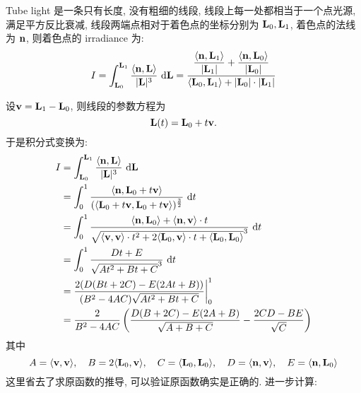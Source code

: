 Tube light 是一条只有长度, 没有粗细的线段, 线段上每一处都相当于一个点光源, 满足平方反比衰减, 线段两端点相对于着色点的坐标分别为 $\bold{L}_0, \bold{L}_1$, 着色点的法线为 $\bold{n}$, 则着色点的 irradiance 为:
\[I = \int_{\bold{L}_0}^{\bold{L}_1}\frac{\langle \bold{n},\bold{L} \rangle}{|\bold{L}|^3}\ \mathrm{d}\bold{L} = \frac{\dfrac{\langle\bold{n},\bold{L}_1\rangle}{|\bold{L}_1|}+\dfrac{\langle\bold{n},\bold{L}_0\rangle}{|\bold{L}_0|} }{\langle\bold{L}_0,\bold{L}_1\rangle + |\bold{L}_0|\cdot|\bold{L}_1|}\]

设$\bold{v} = \bold{L}_1 - \bold{L}_0$, 则线段的参数方程为 
\[
\bold{L}(t) = \bold{L}_0 + t\bold{v}.
\]
于是积分式变换为:
\begin{align*}
I &= \int_{\bold{L}_0}^{\bold{L}_1}\frac{\langle \bold{n},\bold{L} \rangle}{|\bold{L}|^3}\ \mathrm{d}\bold{L} \\
&= \int_0^1\frac{\langle \bold{n}, \bold{L}_0+t\bold{v} \rangle}{(\langle \bold{L}_0+t\bold{v},\bold{L}_0+t\bold{v}\rangle)^{\frac{3}{2}}}\ \mathrm{d}t \\
&= \int_0^1\frac{\langle\bold{n},\bold{L}_0\rangle + \langle\bold{n},\bold{v}\rangle\cdot t}{\sqrt{\langle\bold{v},\bold{v}\rangle\cdot t^2 + 2\langle\bold{L}_0,\bold{v}\rangle\cdot t + \langle\bold{L}_0,\bold{L}_0\rangle}^3}\ \mathrm{d}t \\
&= \int_0^1\frac{Dt+E}{\sqrt{At^2+Bt+C}^3}\ \mathrm{d}t \\
&= \frac{2(D(Bt+2C) - E(2At+B))}{(B^2-4AC)\sqrt{At^2+Bt+C}}\bigg|_0^1\\
&= \frac{2}{B^2-4AC}\left(\frac{D(B + 2C) - E(2A+B)}{\sqrt{A+B+C}} - \frac{2CD - BE}{\sqrt{C}}\right)
\end{align*}
其中
\[
A = \langle\bold{v},\bold{v}\rangle, \quad
B = 2\langle\bold{L}_0,\bold{v}\rangle, \quad
C = \langle\bold{L}_0,\bold{L}_0\rangle, \quad
D = \langle\bold{n},\bold{v}\rangle,\quad 
E = \langle\bold{n},\bold{L}_0\rangle
\]
这里省去了求原函数的推导, 可以验证原函数确实是正确的. 进一步计算:
